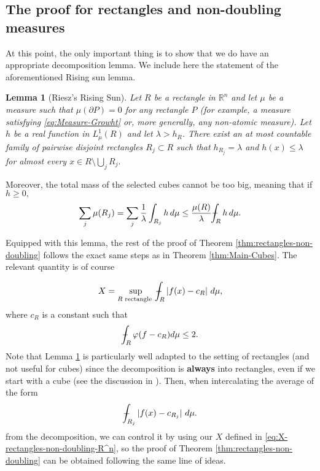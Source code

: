 \documentclass[11pt,a4paper]{amsart}
\newtheorem{lemma}[theorem]{Lemma}
\theoremstyle{definition}
\theoremstyle{remark}
\numberwithin{equation}{section}
\def\R{{\mathbb R}}
\def\Xint#1{\mathchoice
  {\XXint\displaystyle\textstyle{#1}}%
  {\XXint\textstyle\scriptstyle{#1}}%
  {\XXint\scriptstyle\scriptscriptstyle{#1}}%
  {\XXint\scriptscriptstyle\scriptscriptstyle{#1}}%
  \!\int}
\def\XXint#1#2#3{{\setbox0=\hbox{$#1{#2#3}{\int}$}
    \vcenter{\hbox{$#2#3$}}\kern-.5\wd0}}
\def\avgint{\Xint-}
\numberwithin{equation}{section}
\begin{document}
\subsection{The proof for rectangles and non-doubling measures}\label{sec:rectangles}

At this point, the only important thing is to show that we do have an appropriate decomposition lemma. We include here the statement of the aforementioned Rising sun lemma.

\begin{lemma}[Riesz's Rising Sun]\label{lem:Sun}
Let $R$ be a rectangle in $\R^n$ and let $\mu$ be a measure such that $\mu(\partial P)=0$ for any rectangle $P$ (for example, a measure satisfying \eqref{eq:Measure-Growht} or, more generally, any non-atomic measure). Let $h$ be a real function in $L^1_{\mu}(R)$  and let $\lambda >h_R$. There exist an at most countable family of pairwise disjoint rectangles $R_j\subset R$ such that $h_{R_j}=\lambda$ and $h(x) \leq \lambda$ for almost every $x\in R\setminus \bigcup_j R_j.$
\end{lemma}

Moreover, the total mass of the selected cubes cannot be too big, meaning that if $h \geq 0,$
%
\begin{equation*}
\sum_j \mu(R_j) = \sum_j \frac 1\lambda \int_{R_j}h\, d\mu \leq \frac{\mu(R)}{\lambda} \avgint_Rh \, d\mu.
\end{equation*}

Equipped with this lemma, the rest of the proof of Theorem \ref{thm:rectangles-non-doubling} follows the exact same steps as in Theorem \ref{thm:Main-Cubes}. The relevant quantity is of course 

\begin{equation}\label{eq:X-rectangles-non-doubling-R^n}
X = \sup_{R \text{ rectangle } }  \avgint_R |f(x)-c_R|\ d\mu,
\end{equation}
where $c_R$ is a constant such that 
%
\[
\avgint_R \varphi(f-c_R)d\mu \leq 2.
\]
%
Note that Lemma \ref{lem:Sun} is particularly well adapted to the setting of rectangles (and not useful for cubes) since the decomposition is \textbf{always} into rectangles, even if we start with a cube (see the discussion in \cite{KLS}). Then, when intercalating the average of the form 
\begin{equation*}
\avgint_{R_j} |f(x)-c_{R_j}|\ d\mu.
\end{equation*}
from the decomposition, we can control it by using our $X$ defined in \eqref{eq:X-rectangles-non-doubling-R^n}, so the proof of Theorem \ref{thm:rectangles-non-doubling} can be obtained following the same line of ideas.
\end{document}
